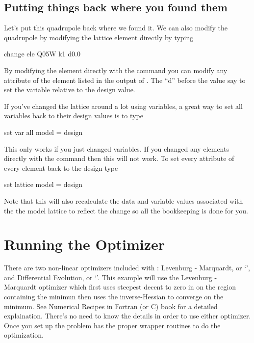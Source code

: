 \subsection{Putting things back where you found them}
\label{ss:put_it_back}

Let's put this quadrupole back where we found it. We can also modify the quadrupole
by modifying the lattice element directly by typing
\begin{example}
  change ele Q05W k1 d0.0
\end{example}
By modifying the element directly with the  command you can
modify any attribute of the element listed in the output of .
The ``d'' before the value say to set the variable relative to the design value.

If you've changed the lattice around a lot using variables, a great way to set
all variables back to their design values is to type
\begin{example}
  set var all model = design
\end{example}
This only works if you just changed variables. If you changed any elements
directly with the  command then this will not work. To set
every attribute of every element back to the design type
\begin{example}
  set lattice model = design
\end{example}
Note that this will also recalculate the data and variable values associated with the
the model lattice to reflect the change so all the bookkeeping is done for you.


\section{Running the Optimizer}
\label{s:optimizer}

There are two non-linear optimizers included with \tao: Levenburg - Marquardt,
or `', and
Differential Evolution, or `'. This example will use the 
Levenburg - Marquardt optimizer which first uses steepest decent to zero in on
the region containing the minimun then uses the inverse-Hessian to converge on
the minimum. See Numerical Recipes in Fortran (or C) book for a detailed
explaination. There's no need to know the details in order to use either
optimizer. Once you set up the problem \tao has the proper wrapper routines to
do the optimization.


